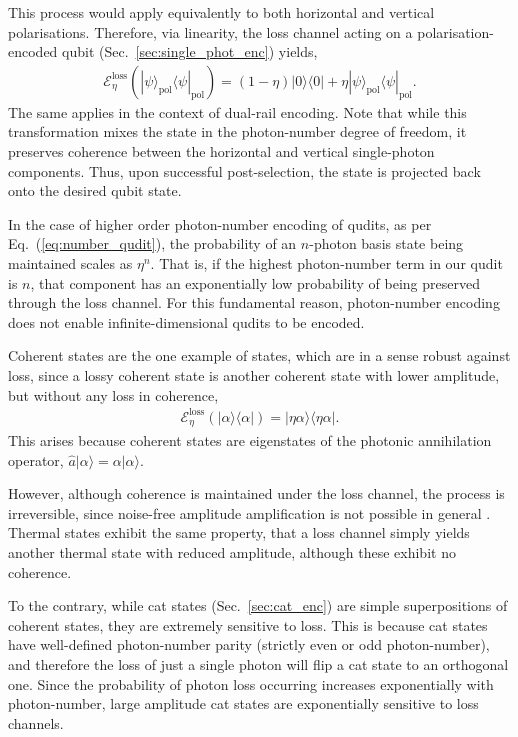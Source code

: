\documentclass[aps, rmp, twocolumn, amsmath, amssymb, nofootinbib, superscriptaddress, longbibliography, floatfix, table-of-contents, eqsecnum]{revtex4-1}
\newcommand{\bra}[1]{\langle#1|}
\newcommand{\ket}[1]{|#1\rangle}
\begin{document}
This process would apply equivalently to both horizontal and vertical polarisations. Therefore, via linearity, the loss channel acting on a polarisation-encoded qubit (Sec.~\ref{sec:single_phot_enc}) yields,
\begin{align}
\mathcal{E}^\text{loss}_\eta(\ket\psi_\text{pol}\bra\psi_\text{pol}) = (1-\eta) \ket{0}\bra{0} + \eta\ket\psi_\text{pol}\bra\psi_\text{pol}.
\end{align}
The same applies in the context of dual-rail encoding. Note that while this transformation mixes the state in the photon-number degree of freedom, it preserves coherence between the horizontal and vertical single-photon components. Thus, upon successful post-selection, the state is projected back onto the desired qubit state.

In the case of higher order photon-number encoding of qudits, as per Eq.~(\ref{eq:number_qudit}), the probability of an $n$-photon basis state being maintained scales as $\eta^n$. That is, if the highest photon-number term in our qudit is $n$, that component has an exponentially low probability of being preserved through the loss channel. For this fundamental reason, photon-number encoding does not enable infinite-dimensional qudits to be encoded.

Coherent states are the one example of states, which are in a sense robust against loss, since a lossy coherent state is another coherent state with lower amplitude, but without any loss in coherence,
\begin{align}
\mathcal{E}^\text{loss}_\eta(\ket\alpha\bra\alpha) = \ket{\eta\alpha}\bra{\eta\alpha}.
\end{align}
This arises because coherent states are eigenstates of the photonic annihilation operator, \mbox{$\hat{a}\ket{\alpha}=\alpha\ket{\alpha}$}.

However, although coherence is maintained under the loss channel, the process is irreversible, since noise-free amplitude amplification is not possible in general \cite{???}. Thermal states exhibit the same property, that a loss channel simply yields another thermal state with reduced amplitude, although these exhibit no coherence.

To the contrary, while cat states (Sec.~\ref{sec:cat_enc}) are simple superpositions of coherent states, they are extremely sensitive to loss. This is because cat states have well-defined photon-number parity (strictly even or odd photon-number), and therefore the loss of just a single photon will flip a cat state to an orthogonal one. Since the probability of photon loss occurring increases exponentially with photon-number, large amplitude cat states are exponentially sensitive to loss channels.
\end{document}
